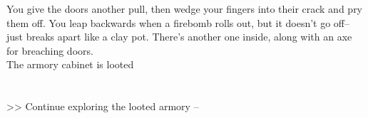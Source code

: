 You give the doors another pull, then wedge your fingers into their crack and pry them off. You leap backwards when a firebomb rolls out, but it doesn’t go off--just breaks apart like a clay pot. There’s another one inside, along with an axe for breaching doors.\\
 The armory cabinet is looted\\
\\
\\

>> Continue exploring the looted armory -- 